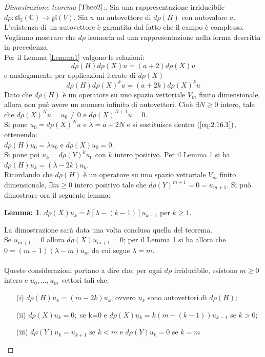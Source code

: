 \documentclass[12pt,a4paper]{report}
\theoremstyle{definition}
\theoremstyle{definition}
\theoremstyle{definition}
\newtheorem{Lem}[Def]{Lemma:}
\theoremstyle{remark}
\begin{document}
\begin{proof}[Dimostrazione teorema $\ref{Theo2}$:]
	Sia una rappresentazione irriducibile $d\rho:\mathfrak{sl_2(\mathbb{C})}\rightarrow \mathfrak{gl}(V)$. Sia $u$ un autovettore di $d\rho(H)$ con autovalore $a$. L'esistenza di un autovettore è garantita dal fatto che il campo è complesso. Vogliamo mostrare che $d\rho$ isomorfa ad una rappresentazione nella forma descritta in precedenza.\\
	Per il Lemma \ref{Lemma1} valgono le relazioni: $$d\rho(H)d\rho(X)u=(a+2)d\rho(X)u$$ e analogamente per applicazioni iterate di $d\rho(X)$
	\begin{equation}
		\label{eq:2.16.1}
		d\rho(H)d\rho(X)^ku=(a+2k)d\rho(X)^ku
		\tag{1}
	\end{equation}
	Dato che $d\rho(H)$ è un operatore su uno spazio vettoriale $V_m$ finito dimensionale, allora non può avere un numero infinito di autovettori. Cioè $\exists N\geq 0$ intero, tale che $d\rho(X)^Nu=u_0\neq0$ e $d\rho(X)^{N+1}u=0$.\\
	Si pone $u_0=d\rho(X)^Nu$ e $\lambda=a+2N$ e si sostituisce dentro $(\ref{eq:2.16.1})$, ottenendo:\\  $d\rho(H)u_0=\lambda u_0$ e $d\rho(X)u_0=0$.	\\
	Si pone poi $u_k=d\rho(Y)^ku_0$ con $k$ intero positivo. Per il Lemma 1 si ha $d\rho(H)u_k=(\lambda-2k)u_k$.\\
	Ricordando che $d\rho(H)$ è un operatore su uno spazio vettoriale $V_m$ finito dimensionale, $\exists m\geq0$ intero positivo tale che  $d\rho(Y)^{m+1}=0=u_{m+1}$. Si può dimostrare ora il seguente lemma:
	\begin{Lem}\label{Lemma2}
		$d\rho(X)u_k=k[\lambda-(k-1)]u_{k-1}$ per $k\geq 1$.
	\end{Lem} 
La dimostrazione sarà data una volta conclusa quella del teorema.
\\Se $u_{m+1}=0$ allora $d\rho(X)u_{m+1}=0$; per il Lemma \ref{Lemma2} si ha allora che $0=(m+1)(\lambda-m)u_m$ da cui segue $\lambda=m$.\\
\\
	Queste considerazioni portano a dire che: per ogni $d\rho $ irriducibile, esistono $m\geq0$ intero e $u_0,...,u_m$ vettori tali che:\begin{itemize}
		\item[(i)] $d\rho(H)u_k=(m-2k)u_k$, ovvero $u_k$ sono autovettori di $d\rho(H)$;
		\item[(ii)] $d\rho(X)u_k=0;$ se k=0 e $d\rho(X)u_k=k(m-(k-1))u_{k-1}$ se $k>0$;
		\item[(iii)] $d\rho(Y)u_k=u_{k+1}$ se $k<m$ e $d\rho(Y)u_k=0$ se $k=m$

\end{itemize}
\end{proof}
\end{document}
